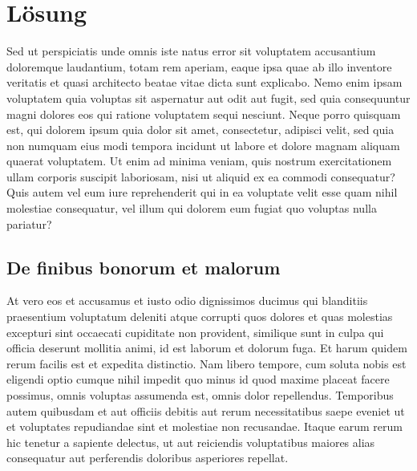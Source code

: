 %
%
%
\section{Lösung
\label{fem:section:loesung}}
Sed ut perspiciatis unde omnis iste natus error sit voluptatem
accusantium doloremque laudantium, totam rem aperiam, eaque ipsa
quae ab illo inventore veritatis et quasi architecto beatae vitae
dicta sunt explicabo. Nemo enim ipsam voluptatem quia voluptas sit
aspernatur aut odit aut fugit, sed quia consequuntur magni dolores
eos qui ratione voluptatem sequi nesciunt. Neque porro quisquam
est, qui dolorem ipsum quia dolor sit amet, consectetur, adipisci
velit, sed quia non numquam eius modi tempora incidunt ut labore
et dolore magnam aliquam quaerat voluptatem. Ut enim ad minima
veniam, quis nostrum exercitationem ullam corporis suscipit laboriosam,
nisi ut aliquid ex ea commodi consequatur? Quis autem vel eum iure
reprehenderit qui in ea voluptate velit esse quam nihil molestiae
consequatur, vel illum qui dolorem eum fugiat quo voluptas nulla
pariatur?

\subsection{De finibus bonorum et malorum
\label{fem:subsection:bonorum}}
At vero eos et accusamus et iusto odio dignissimos ducimus qui
blanditiis praesentium voluptatum deleniti atque corrupti quos
dolores et quas molestias excepturi sint occaecati cupiditate non
provident, similique sunt in culpa qui officia deserunt mollitia
animi, id est laborum et dolorum fuga. Et harum quidem rerum facilis
est et expedita distinctio. Nam libero tempore, cum soluta nobis
est eligendi optio cumque nihil impedit quo minus id quod maxime
placeat facere possimus, omnis voluptas assumenda est, omnis dolor
repellendus. Temporibus autem quibusdam et aut officiis debitis aut
rerum necessitatibus saepe eveniet ut et voluptates repudiandae
sint et molestiae non recusandae. Itaque earum rerum hic tenetur a
sapiente delectus, ut aut reiciendis voluptatibus maiores alias
consequatur aut perferendis doloribus asperiores repellat.


